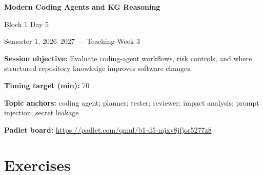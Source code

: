 \documentclass[11pt]{article}
\begin{document}
\begin{center}\LARGE\bfseries Modern Coding Agents and KG Reasoning\end{center}

\begin{center}\large Block 1 Day 5\end{center}

\begin{center}Semester 1, 2026--2027 --- Teaching Week 3\end{center}

\begin{tcolorbox}[colback=MidnightBlue!4,colframe=MidnightBlue,title={Session Overview},fonttitle=\bfseries,breakable]
\textbf{Session objective:} Evaluate coding-agent workflows, risk controls, and where structured repository knowledge improves software changes.

\textbf{Timing target (min):} 70

\textbf{Topic anchors:} coding agent; planner; tester; reviewer; impact analysis; prompt injection; secret leakage

\textbf{Padlet board:} \url{https://padlet.com/qmul/b1-d5-mjxv8jfjor5277z8}
\end{tcolorbox}

\section*{Exercises}
\end{document}
